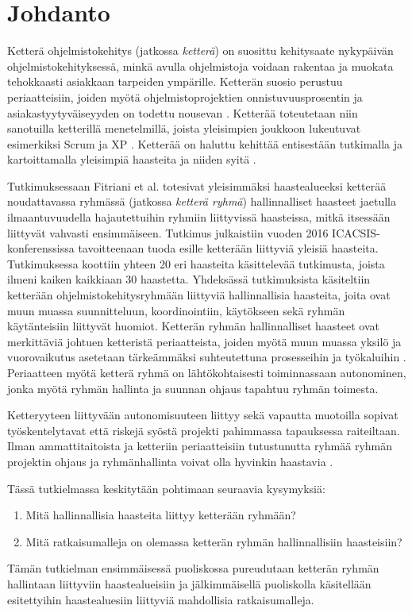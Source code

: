 \chapter{Johdanto\label{intro}}

Ketterä ohjelmistokehitys (jatkossa \textit{ketterä}) on suosittu kehitysaate nykypäivän ohjelmistokehityksessä, minkä avulla ohjelmistoja voidaan rakentaa ja muokata tehokkaasti asiakkaan tarpeiden ympärille. Ketterän suosio perustuu periaatteisiin, joiden myötä ohjelmistoprojektien onnistuvuusprosentin ja asiakastyytyväiseyyden on todettu nousevan \cite{9533020}. Ketterää toteutetaan niin sanotuilla ketterillä menetelmillä, joista yleisimpien joukkoon lukeutuvat esimerkiksi Scrum \cite{SCRUMORG} ja XP \cite{XPORG}. Ketterää on haluttu kehittää entisestään tutkimalla ja kartoittamalla yleisimpiä haasteita ja niiden syitä \cite{7872736}.

Tutkimuksessaan Fitriani et al. \cite{7872736} totesivat yleisimmäksi haastealueeksi ketterää noudattavassa ryhmässä (jatkossa \textit{ketterä ryhmä}) hallinnalliset haasteet jaetulla ilmaantuvuudella hajautettuihin ryhmiin liittyvissä haasteissa, mitkä itsessään liittyvät vahvasti ensimmäiseen. Tutkimus julkaistiin vuoden 2016 ICACSIS-konferenssissa tavoitteenaan tuoda esille ketterään liittyviä yleisiä haasteita. Tutkimuksessa koottiin yhteen 20 eri haasteita käsittelevää tutkimusta, joista ilmeni kaiken kaikkiaan 30 haastetta. Yhdeksässä tutkimuksista käsiteltiin ketterään ohjelmistokehitysryhmään liittyviä hallinnallisia haasteita, joita ovat muun muassa suunnitteluun, koordinointiin, käytökseen sekä ryhmän käytänteisiin liittyvät huomiot. Ketterän ryhmän hallinnalliset haasteet ovat merkittäviä johtuen ketteristä periaatteista, joiden myötä muun muassa yksilö ja vuorovaikutus asetetaan tärkeämmäksi suhteutettuna prosesseihin ja työkaluihin \cite{beck2001agile}. Periaatteen myötä ketterä ryhmä on lähtökohtaisesti toiminnassaan autonominen, jonka myötä ryhmän hallinta ja suunnan ohjaus tapahtuu ryhmän toimesta.

Ketteryyteen liittyvään autonomisuuteen liittyy sekä vapautta muotoilla sopivat työskentelytavat että riskejä syöstä projekti pahimmassa tapauksessa raiteiltaan. Ilman ammattitaitoista ja ketteriin periaatteisiin tutustunutta ryhmää ryhmän projektin ohjaus ja ryhmänhallinta voivat olla hyvinkin haastavia \cite{7872736}.

Tässä tutkielmassa keskitytään pohtimaan seuraavia kysymyksiä: \begin{enumerate}
    \item Mitä hallinnallisia haasteita liittyy ketterään ryhmään?
    \item Mitä ratkaisumalleja on olemassa ketterän ryhmän hallinnallisiin haasteisiin?
\end{enumerate}

Tämän tutkielman ensimmäisessä puoliskossa pureudutaan ketterän ryhmän hallintaan liittyviin haastealueisiin ja jälkimmäisellä puoliskolla käsitellään esitettyihin haastealuesiin liittyviä mahdollisia ratkaisumalleja.
